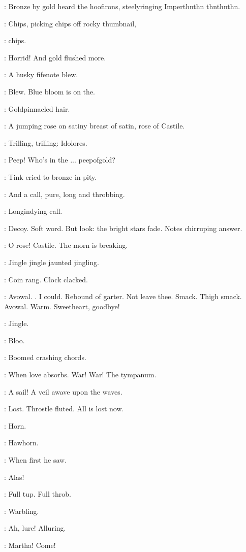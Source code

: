 :
Bronze by gold heard the hoofirons, steelyringing
Imperthnthn thnthnthn.

:
Chips, picking chips off rocky thumbnail,

\BloomInt:
chips.

\BloomInt:
Horrid! And gold flushed more.

:
A husky fifenote blew.

\BloomInt:
Blew. Blue bloom is on the.

:
Goldpinnacled hair.

\BloomInt:
A jumping rose on satiny breast of satin, rose of Castile.

\BloomInt:
Trilling, trilling: Idolores.

\BloomInt:
Peep! Who's in the ...
peepofgold?

:
Tink cried to bronze in pity.

:
And a call, pure, long and throbbing.

\BloomInt:
Longindying call.

\BloomInt:
Decoy. Soft word. But look: the bright stars fade. Notes chirruping
answer.

\BloomInt:
O rose! Castile. The morn is breaking.

\BloomInt:
Jingle jingle jaunted jingling.

\BloomInt:
Coin rang. Clock clacked.

\BloomInt:
Avowal. . I could. Rebound of garter.
Not leave thee. Smack.
 Thigh smack. Avowal. Warm.
Sweetheart, goodbye!

\BloomInt:
Jingle.

\BloomInt:
Bloo.

:
Boomed crashing chords.

\BloomInt:
When love absorbs. War! War!
The tympanum.

\BloomInt:
A sail! A veil awave upon the waves.

\BloomInt:
Lost. Throstle fluted. All is lost now.

\BloomInt:
Horn.

:
Hawhorn.

:
When first he saw.

\BloomInt:
Alas!

\BloomInt:
Full tup. Full throb.

:
Warbling.

\BloomInt:
Ah, lure! Alluring.

\BloomInt:
Martha! Come!

